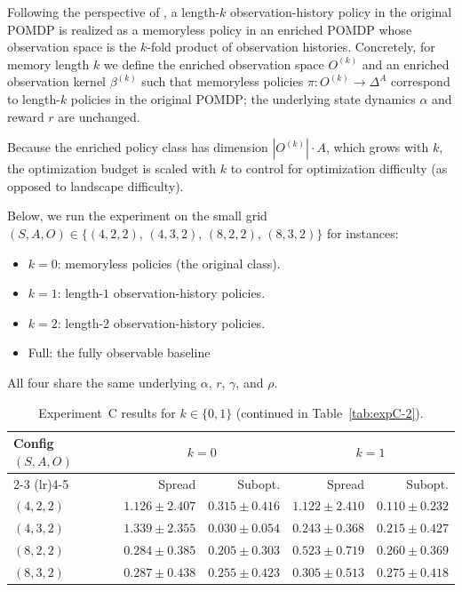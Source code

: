 \documentclass{article}
\theoremstyle{definition}
\theoremstyle{remark}
\begin{document}
Following the perspective of \citet{azizzadenesheli2020policygradientpartiallyobservable}, a length-$k$ observation-history policy in the original POMDP is realized as a memoryless policy in an enriched POMDP whose observation space is the $k$-fold product of observation histories. Concretely, for memory length $k$ we define the enriched observation space $O^{(k)}$ and an enriched observation kernel $\beta^{(k)}$ such that memoryless policies $\pi \colon O^{(k)} \to \Delta^A$ correspond to length-$k$ policies in the original POMDP; the underlying state dynamics $\alpha$ and reward $r$ are unchanged.
 
Because the enriched policy class has dimension $|O^{(k)}| \cdot A$, which grows with $k$, the optimization budget is scaled with $k$ to control for optimization difficulty (as opposed to landscape difficulty).
 
Below, we run the experiment on the small grid $(S, A, O) \in \{(4,2,2),\,(4,3,2),\,(8,2,2),\,(8,3,2)\}$ for instances:
 
\begin{itemize}
  \item $k = 0$: memoryless policies (the original class).
  \item $k = 1$: length-$1$ observation-history policies.
  \item $k = 2$: length-$2$ observation-history policies.
  \item Full: the fully observable baseline
\end{itemize}
 
All four share the same underlying $\alpha$, $r$, $\gamma$, and $\rho$. 
\begin{table}[h]
  \caption{Experiment~C results for $k \in \{0,1\}$ (continued in Table~\ref{tab:expC-2}).}
  \centering
  \small
  \renewcommand{\arraystretch}{1.15}
  \begin{tabular}{@{}lrrrr@{}}
    \toprule
    Config $(S,A,O)$
      & \multicolumn{2}{c}{$k=0$}
      & \multicolumn{2}{c}{$k=1$} \\
    \cmidrule(lr){2-3}
    \cmidrule(lr){4-5}
    & Spread & Subopt.
      & Spread & Subopt. \\
    \midrule
    $(4,2,2)$ & $1.126 \pm 2.407$ & $0.315 \pm 0.416$ & $1.122 \pm 2.410$ & $0.110 \pm 0.232$ \\
    $(4,3,2)$ & $1.339 \pm 2.355$ & $0.030 \pm 0.054$ & $0.243 \pm 0.368$ & $0.215 \pm 0.427$ \\
    $(8,2,2)$ & $0.284 \pm 0.385$ & $0.205 \pm 0.303$ & $0.523 \pm 0.719$ & $0.260 \pm 0.369$ \\
    $(8,3,2)$ & $0.287 \pm 0.438$ & $0.255 \pm 0.423$ & $0.305 \pm 0.513$ & $0.275 \pm 0.418$ \\
    \bottomrule
  \end{tabular}
  
  \label{tab:expC-1}
\end{table}
\end{document}
